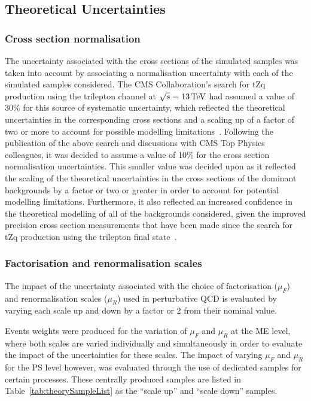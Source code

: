 \newpage

\subsection{Theoretical Uncertainties}\label{sec:theorySysts}
\subsubsection{Cross section normalisation}
The uncertainty associated with the cross sections of the simulated samples was taken into account by associating a normalisation uncertainty with each of the simulated samples considered.
The CMS Collaboration's search for tZq production using the trilepton channel at $\sqrt{s} = 13\,\text{Te\hspace{-.08em}V}$ had assumed a value of 30\% for this source of systematic uncertainty, which reflected the theoretical uncertainties in the corresponding cross sections and a scaling up of a factor of two or more to account for possible modelling limitations~\cite{Sirunyan:2017nbr}.
Following the publication of the above search and discussions with CMS Top Physics colleagues, it was decided to assume a value of 10\% for the cross section normalisation uncertainties.
This smaller value was decided upon as it reflected the scaling of the theoretical uncertainties in the cross sections of the dominant backgrounds by a factor or two or greater in order to account for potential modelling limitations.
Furthermore, it also reflected an increased confidence in the theoretical modelling of all of the backgrounds considered, given the improved precision cross section measurements that have been made since the search for tZq production using the trilepton final state~\cite{combineNick,crossSectionSystematics}. 


\subsubsection{Factorisation and renormalisation scales}
The impact of the uncertainty associated with the choice of factorisation ($\mu_{F}$) and renormalisation scales ($\mu_{R}$) used in perturbative QCD is evaluated by varying each scale up and down by a factor or 2 from their nominal value.

Events weights were produced for the variation of $\mu_{F}$ and $\mu_{R}$ at the ME level, where both scales are varied individually and simultaneously in order to evaluate the impact of the uncertainties for these scales.
The impact of varying $\mu_{F}$ and $\mu_{R}$ for the PS level however, was evaluated through the use of dedicated samples for certain processes.
These centrally produced samples are listed in Table~\ref{tab:theorySampleList} as the ``scale up'' and ``scale down'' samples. 


